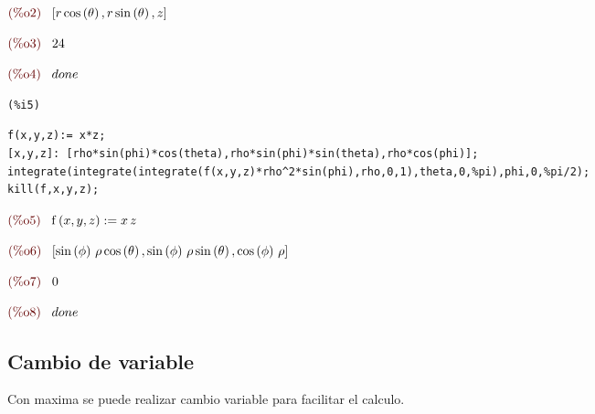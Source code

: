 \documentclass[12pt]{article}
\begin{document}
\begin{math}\displaystyle
\parbox{8ex}{\color{labelcolor}(\%o2) }
[r\,\mathrm{cos}\left( \theta\right) ,r\,\mathrm{sin}\left( \theta\right) ,z]
\end{math}

\begin{math}\displaystyle
\parbox{8ex}{\color{labelcolor}(\%o3) }
24
\end{math}

\begin{math}\displaystyle
\parbox{8ex}{\color{labelcolor}(\%o4) }
done
\end{math}


\noindent
\begin{minipage}[t]{8ex}{\color{red}\bf
\begin{verbatim}
(%i5) 
\end{verbatim}}
\end{minipage}
\begin{minipage}[t]{\textwidth}{\color{blue}
\begin{verbatim}
f(x,y,z):= x*z;
[x,y,z]: [rho*sin(phi)*cos(theta),rho*sin(phi)*sin(theta),rho*cos(phi)];
integrate(integrate(integrate(f(x,y,z)*rho^2*sin(phi),rho,0,1),theta,0,%pi),phi,0,%pi/2);
kill(f,x,y,z);
\end{verbatim}}
\end{minipage}
\begin{math}\displaystyle
\parbox{8ex}{\color{labelcolor}(\%o5) }
\mathrm{f}\left( x,y,z\right) :=x\,z
\end{math}

\begin{math}\displaystyle
\parbox{8ex}{\color{labelcolor}(\%o6) }
[\mathrm{sin}\left( \phi\right) \,\rho\,\mathrm{cos}\left( \theta\right) ,\mathrm{sin}\left( \phi\right) \,\rho\,\mathrm{sin}\left( \theta\right) ,\mathrm{cos}\left( \phi\right) \,\rho]
\end{math}

\begin{math}\displaystyle
\parbox{8ex}{\color{labelcolor}(\%o7) }
0
\end{math}

\begin{math}\displaystyle
\parbox{8ex}{\color{labelcolor}(\%o8) }
done
\end{math}

\subsection{Cambio de variable}
Con maxima se puede realizar cambio variable para facilitar el calculo.
\end{document}
